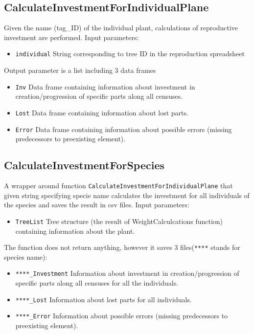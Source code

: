 \documentclass[10pt]{book} %
\begin{document}
\subsection*{CalculateInvestmentForIndividualPlane}
Given the name (tag\_ID) of the individual plant, calculations of reproductive investment are performed.
Input parameters:
\begin{itemize}
\item \texttt{individual}  String corresponding to tree ID in the reproduction spreadsheet
\end{itemize}
Output parameter is a list including 3 data frames
\begin{itemize}
\item \texttt{Inv} Data frame containing information about investment in creation/progression of specific parts along all censuses.
\item \texttt{Lost} Data frame containing information about lost parts.
\item \texttt{Error} Data frame containing information about possible errors (missing predecessors to preexisting element).
\end{itemize}

\subsection*{CalculateInvestmentForSpecies}
A wrapper around function \texttt{CalculateInvestmentForIndividualPlane} that given string specifying specie name calculates the investment for all individuals of the species and saves the result in csv files.
Input parameters:
\begin{itemize}
\item \texttt{TreeList}  Tree structure (the result of WeightCalculcations function) containing information about the plant.
\end{itemize}
The function does not return anything, however it saves 3 files(\texttt{****} stands for species name):
\begin{itemize}
\item \texttt{****\_Investment} Information about investment in creation/progression of specific parts along all censuses for all the individuals.
\item \texttt{****\_Lost} Information about lost parts for all individuals.
\item \texttt{****\_Error} Information about possible errors (missing predecessors to preexisting element).
\end{itemize}
\end{document}
